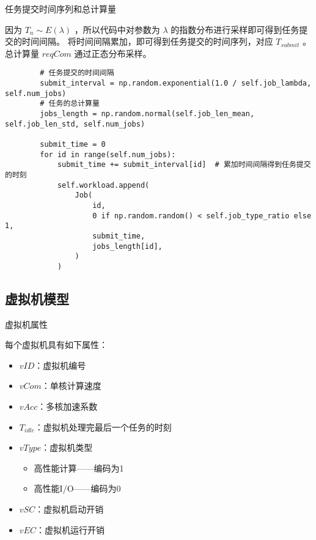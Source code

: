 \begin{frame}[fragile]{任务提交时间序列和总计算量}

    因为 $T_n \sim E(\lambda)$ ，所以代码中对参数为 $\lambda$ 的指数分布进行采样即可得到任务提交的时间间隔。
    将时间间隔累加，即可得到任务提交的时间序列，对应 $T_{submit}$ 。总计算量 $reqCom$ 通过正态分布采样。

    \scriptsize
    \begin{verbatim}
        # 任务提交的时间间隔
        submit_interval = np.random.exponential(1.0 / self.job_lambda, self.num_jobs)
        # 任务的总计算量
        jobs_length = np.random.normal(self.job_len_mean, self.job_len_std, self.num_jobs)

        submit_time = 0
        for id in range(self.num_jobs):
            submit_time += submit_interval[id]  # 累加时间间隔得到任务提交的时刻
            self.workload.append(
                Job(
                    id,
                    0 if np.random.random() < self.job_type_ratio else 1,
                    submit_time,
                    jobs_length[id],
                )
            )
    \end{verbatim}

\end{frame}

\subsection{虚拟机模型}

\begin{frame}{虚拟机属性}

    每个虚拟机具有如下属性：

    \begin{itemize}
        \item $vID$：虚拟机编号
        \item $vCom$：单核计算速度
        \item $vAcc$：多核加速系数
        \item $T_{idle}$：虚拟机处理完最后一个任务的时刻
        \item $vType$：虚拟机类型
              \begin{itemize}
                  \item 高性能计算——编码为1
                  \item 高性能I/O——编码为0
              \end{itemize}
        \item $vSC$：虚拟机启动开销
        \item $vEC$：虚拟机运行开销
    \end{itemize}
\end{frame}

